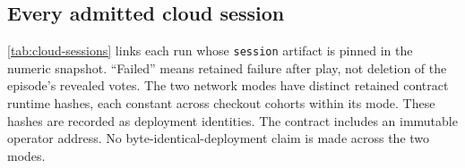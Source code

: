 \clearpage
\subsection{Every admitted cloud session}
\autoref{tab:cloud-sessions} links each run whose \texttt{session} artifact is pinned in the
numeric snapshot. ``Failed'' means retained failure after play, not deletion
of the episode's revealed votes.
The two network modes have distinct retained contract runtime hashes, each
constant across checkout cohorts within its mode. These hashes are recorded
as deployment identities. The contract includes an immutable operator address.
No byte-identical-deployment claim is made across the two modes.
\begingroup\small
\newcommand{\CloudSessionCaption}{Every admitted cloud session at the frozen
cutoff. Cohort labels identify source checkouts. Failed sessions retain their
played evidence.}

\endgroup

